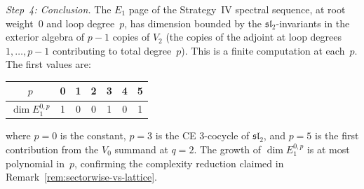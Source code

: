 \begin{computation}
\emph{Step~4: Conclusion.}
The $E_1$ page of the Strategy~IV spectral sequence, at root
weight~$0$ and loop degree~$p$, has dimension bounded by the
$\mathfrak{sl}_2$-invariants in the exterior algebra of
$p - 1$ copies of $V_2$ (the copies of the adjoint at
loop degrees $1, \ldots, p-1$ contributing to total degree~$p$).
This is a finite computation at each~$p$. The first values are:
\begin{center}
\begin{tabular}{c|cccccc}
$p$ & 0 & 1 & 2 & 3 & 4 & 5 \\
\hline
$\dim E_1^{0,p}$ & 1 & 0 & 0 & 1 & 0 & 1 \\
\end{tabular}
\end{center}
where $p = 0$ is the constant, $p = 3$ is the CE $3$-cocycle of
$\mathfrak{sl}_2$, and $p = 5$ is the first contribution from the
$V_0$ summand at $q = 2$. The growth of
$\dim E_1^{0,p}$ is at most polynomial in~$p$, confirming the
complexity reduction claimed in
Remark~\ref{rem:sectorwise-vs-lattice}.
\end{computation}

